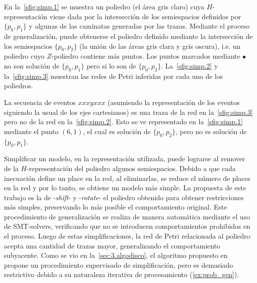 \begin{example} 
    \label{ex:polyhedra}
    En la~\autoref{sfig:simp.1} se muestra un poliedro (el área gris claro) cuya $H$-representación viene
    dada por la intersección de los semiespacios definidos por $\{p_0,p_1\}$ y algunas de las caminatas generadas por las trazas.
    Mediante el proceso de generalización, puede obtenerse el poliedro definido 
    mediante la intersección de los semiespacios $\{p_0,p_2\}$ (la unión de las áreas gris clara y gris oscura), 
    i.e. un poliedro cuyo $Z$-poliedro contiene más puntos.
    Los puntos marcados mediante $\bullet$ no son solución de $\{p_0,p_1\}$ pero si lo son de $\{p_0,p_2\}$.
    La~\autoref{sfig:simp.2} y la~\autoref{sfig:simp.3} muestran las redes de Petri inferidas por cada uno 
    de los poliedros. 

    La secuencia de eventos $xxxyxxx$ (asumiendo la representación de los eventos siguiendo la usual de los 
    ejes cartesianos) es una traza de la red en la~\autoref{sfig:simp.3} pero no de la red en la~\autoref{sfig:simp.2}.
    Esto se ve representado en la~\autoref{sfig:simp.1} mediante el punto $(6,1)$, el cual es solución de $\{p_0,p_2\}$,
    pero no es solución de $\{p_0,p_1\}$.
\end{example}

Simplificar un modelo, en la representación utilizada, puede lograrse al remover 
de la $H$-representación del poliedro algunos semiespacios. Debido a que cada inecuación
define un place en la red, al eliminarlas, se reduce el número de places en la red y por lo tanto,
se obtiene un modelo más simple. 
La propuesta de este trabajo es la de  -\textit{shift}- y  
-\textit{rotate}- el poliedro obtenido para obtener restricciones más simples, 
preservando lo más posible el comportamiento original. Este procedimiento
de generalización se realiza de manera automática mediante el uso de SMT-solvers, 
verificando que no se introducen comportamientos prohibidos en el proceso.
Luego de estas simplificaciones, la red de Petri relacionada al poliedro acepta
una cantidad de trazas mayor, generalizando el comportamiento subyacente. 
Como se vio en la~\autoref{sec:3.algodisco}, el algoritmo propuesto en~\cite{LeonCB15}
propone un procedimiento supervisado de simplificación, pero es demasiado restrictivo
debido a su naturaleza iterativa de procesamiento (\autoref{ex:prob_gen}).


